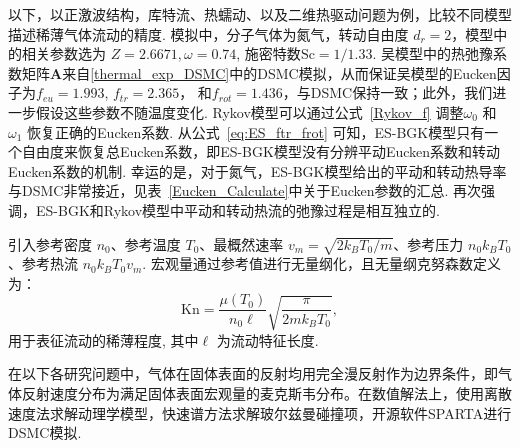 以下，以正激波结构，库特流、热蠕动、以及二维热驱动问题为例，比较不同模型描述稀薄气体流动的精度. 模拟中，分子气体为氮气，转动自由度 $ d_r=2$，模型中的相关参数选为 $Z=2.6671,\omega=0.74$, 施密特数$\text{Sc}=1/1.33$. 吴模型中的热弛豫系数矩阵$\bm{A}$来自\ref{thermal_exp_DSMC}中的DSMC模拟，从而保证吴模型的Eucken因子为$f_{eu}=1.993$, $f_{tr}=2.365$， 和$f_{rot}=1.436$，与DSMC保持一致；此外，我们进一步假设这些参数不随温度变化. Rykov模型可以通过公式~\eqref{Rykov_f} 调整$\omega_0$ 和 $\omega_1$ 恢复正确的Eucken系数. 从公式~\eqref{eq:ES_ftr_frot} 可知，ES-BGK模型只有一个自由度来恢复总Eucken系数，即ES-BGK模型没有分辨平动Eucken系数和转动Eucken系数的机制. 幸运的是，对于氮气，ES-BGK模型给出的平动和转动热导率与DSMC非常接近，见表~\ref{Eucken_Calculate}中关于Eucken参数的汇总. 再次强调，ES-BGK和Rykov模型中平动和转动热流的弛豫过程是相互独立的.


引入参考密度 $n_0$、参考温度 $T_0$、最概然速率 $v_m=\sqrt{2k_BT_0/m}$、参考压力 $n_0k_BT_0$、参考热流 $n_0k_BT_0v_m$. 宏观量通过参考值进行无量纲化，且无量纲克努森数定义为：
\begin{equation}
\text{Kn}=\frac{\mu(T_0)}{n_0\ell}\sqrt{\frac{\pi}{2mk_BT_0}},
\end{equation}
用于表征流动的稀薄程度, 其中$\ell$ 为流动特征长度. 

在以下各研究问题中，气体在固体表面的反射均用完全漫反射作为边界条件，即气体反射速度分布为满足固体表面宏观量的麦克斯韦分布。在数值解法上，使用离散速度法求解动理学模型，快速谱方法求解玻尔兹曼碰撞项\cite{Wu2017Physica}，开源软件SPARTA进行DSMC模拟. 




